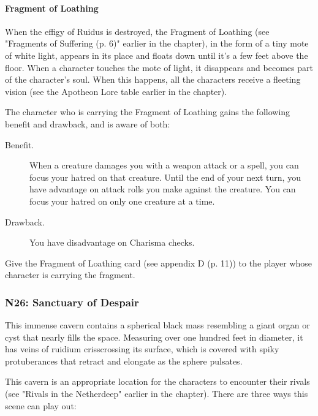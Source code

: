\documentclass[letterpaper, 11pt, bg=full, twocolumn]{dndbook}
\begin{document}
\paragraph{Fragment of Loathing}

When the effigy of Ruidus is destroyed, the Fragment of Loathing (see "Fragments of Suffering (p. 6)" earlier in the chapter), in the form of a tiny mote of white light, appears in its place and floats down until it's a few feet above the floor. When a character touches the mote of light, it disappears and becomes part of the character's soul. When this happens, all the characters receive a fleeting vision (see the Apotheon Lore table earlier in the chapter).

The character who is carrying the Fragment of Loathing gains the following benefit and drawback, and is aware of both:

\begin{DndSidebar}{}
\begin{description}
\item[Benefit.] When a creature damages you with a weapon attack or a spell, you can focus your hatred on that creature. Until the end of your next turn, you have advantage on attack rolls you make against the creature. You can focus your hatred on only one creature at a time.
\item[Drawback.] You have disadvantage on Charisma checks.
\end{description}
\end{DndSidebar}

Give the Fragment of Loathing card (see appendix D (p. 11)) to the player whose character is carrying the fragment.

\subsubsection{N26: Sanctuary of Despair}

\begin{DndReadAloud}
This immense cavern contains a spherical black mass resembling a giant organ or cyst that nearly fills the space. Measuring over one hundred feet in diameter, it has veins of ruidium crisscrossing its surface, which is covered with spiky protuberances that retract and elongate as the sphere pulsates.
\end{DndReadAloud}

This cavern is an appropriate location for the characters to encounter their rivals (see "Rivals in the Netherdeep" earlier in the chapter). There are three ways this scene can play out:
\end{document}
